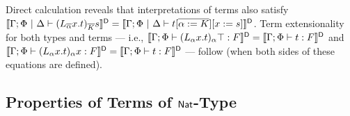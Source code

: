 \documentclass[runningheads]{llncs}
\begin{document}
Direct calculation reveals that interpretations of terms also
satisfy
$\llbracket{\Gamma; \Phi~|~\Delta \vdash
  (L_{\overline{\alpha}}x.t)_{\overline{K}}s}\rrbracket^{\mathsf D} = \llbracket{\Gamma; \Phi~|~\Delta
  \vdash t [\overline{\alpha := K}][x := s]}\rrbracket^{\mathsf D}$.
Term extensionality for both types and terms --- i.e.,
$\llbracket{\Gamma;\Phi\vdash (L_\alpha x.t)_\alpha \top : F}\rrbracket^{\mathsf D} =
\llbracket{\Gamma;\Phi \vdash t : F}\rrbracket^{\mathsf D}$ and
$\llbracket{\Gamma;\Phi\vdash (L_\alpha x.t)_\alpha x : F}\rrbracket^{\mathsf D} =
\llbracket{\Gamma;\Phi \vdash t : F}\rrbracket^{\mathsf D}$
--- follow (when both sides of these equations are defined).

\subsection{Properties of Terms of $\mathsf{Nat}$-Type}\label{sec:Nat-type-terms}
\end{document}
